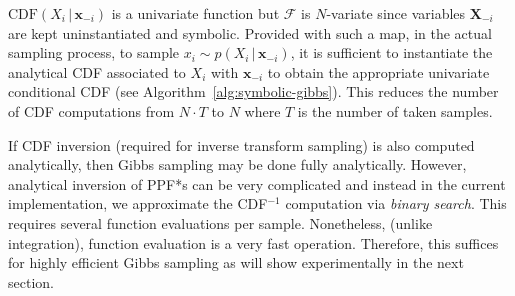 \documentclass[]{article}
\newcommand{\bvec}[1]{\textbf{#1}}
\newcommand{\pr}{p}
\begin{document}
$\text{CDF}(X_i  \,|\, \bvec{x}_{-i})$ is a univariate function but 
$\mathcal{F}$ is $N$-variate since variables $\bvec{X}_{-i}$ are kept uninstantiated and symbolic.
Provided with such a map, in the actual sampling process, 
to sample $x_i \sim \pr(X_i \,|\, \bvec{x}_{-i})$,
it is sufficient to instantiate the analytical CDF associated to $X_i$ with  
$\bvec{x}_{-i}$ to obtain the appropriate univariate conditional CDF
(see Algorithm~\ref{alg:symbolic-gibbs}).
This reduces the number of CDF computations from $N\cdot T$ to $N$ where 
$T$ is the number of taken samples.

If CDF inversion (required for inverse transform sampling)
is also computed analytically, then Gibbs sampling may be done fully analytically.
However, analytical inversion of PPF*s can be very complicated and instead 
in the current implementation, we approximate the CDF$^{-1}$ computation via \emph{binary search}. This requires several function evaluations %
per sample. Nonetheless, (unlike integration), function evaluation is a very fast operation. Therefore, this suffices for highly efficient Gibbs sampling as will show experimentally in the next section.



\end{document}
